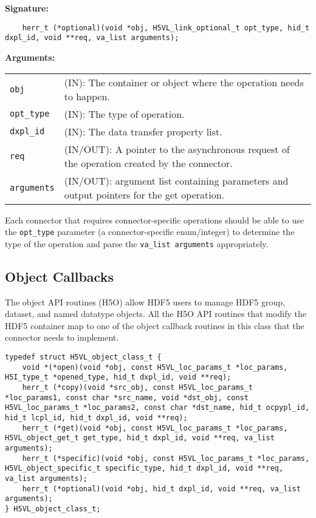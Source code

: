 \begin{mdframed}[style=bgbox]
\textbf{Signature:}
\begin{lstlisting}
    herr_t (*optional)(void *obj, H5VL_link_optional_t opt_type, hid_t dxpl_id, void **req, va_list arguments);
\end{lstlisting}

\textbf{Arguments:}\\
\begin{tabular}{l p{13.5cm}}
  \texttt{obj} & (IN): The container or object where the operation needs to happen.\\
  \texttt{opt\_type} & (IN): The type of operation.\\
  \texttt{dxpl\_id} & (IN): The data transfer property list.\\
  \texttt{req} & (IN/OUT): A pointer to the asynchronous request of the operation created by the connector.\\
  \texttt{arguments} & (IN/OUT): argument list containing parameters and output pointers for the get operation. \\
\end{tabular}
\end{mdframed}

Each connector that requires connector-specific operations should be able to use the \texttt{opt\_type} parameter (a connector-specific enum/integer) to determine the type of the operation and parse the \texttt{va\_list arguments} appropriately.


\subsection{Object Callbacks}
The object API routines (H5O) allow HDF5 users to manage HDF5 group,
dataset, and named datatype objects. All the H5O API routines that
modify the HDF5 container map to one of the object callback routines
in this class that the connector needs to implement.

\begin{lstlisting}[caption={Structure for object callback routines, H5VLconnector.h}, captionpos=b, label={lst:H5Oclass}]
typedef struct H5VL_object_class_t {                                             
    void *(*open)(void *obj, const H5VL_loc_params_t *loc_params, H5I_type_t *opened_type, hid_t dxpl_id, void **req);                                    
    herr_t (*copy)(void *src_obj, const H5VL_loc_params_t *loc_params1, const char *src_name, void *dst_obj, const H5VL_loc_params_t *loc_params2, const char *dst_name, hid_t ocpypl_id, hid_t lcpl_id, hid_t dxpl_id, void **req);   
    herr_t (*get)(void *obj, const H5VL_loc_params_t *loc_params, H5VL_object_get_t get_type, hid_t dxpl_id, void **req, va_list arguments);                 
    herr_t (*specific)(void *obj, const H5VL_loc_params_t *loc_params, H5VL_object_specific_t specific_type, hid_t dxpl_id, void **req, va_list arguments);            
    herr_t (*optional)(void *obj, hid_t dxpl_id, void **req, va_list arguments); 
} H5VL_object_class_t; 
\end{lstlisting}

